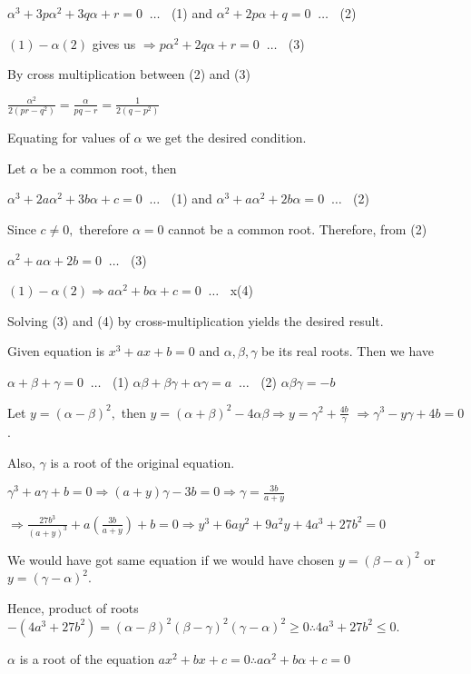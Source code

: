   $\alpha^3 + 3p\alpha^2 + 3q\alpha + r = 0\;\;\ldots\;\;$  (1) and $\alpha^2 + 2p\alpha + q = 0\;\;\ldots\;\;$ (2)

  $(1) - \alpha (2)$ gives us $\Rightarrow p\alpha^2 + 2q\alpha + r = 0\;\;\ldots\;\;$ (3)

  By cross multiplication between (2) and (3)

  $\frac{\alpha^2}{2(pr - q^2)} = \frac{\alpha}{pq - r} = \frac{1}{2(q - p^2)}$

  Equating for values of $\alpha$ we get the desired condition.
\item Let $\alpha$ be a common root, then

  $\alpha^3 + 2a\alpha^2 + 3b\alpha + c = 0\;\;\ldots\;\;$ (1) and $\alpha^3 + a\alpha^2 + 2b\alpha = 0\;\;\ldots\;\;$ (2)

  Since $c \ne 0,$ therefore $\alpha = 0$ cannot be a common root. Therefore, from (2)

  $\alpha^2 + a\alpha + 2b = 0\;\;\ldots\;\;$ (3)

  $(1) - \alpha (2) \Rightarrow a\alpha^2 + b\alpha + c = 0\;\;\ldots\;\;$ x(4)

  Solving (3) and (4) by cross-multiplication yields the desired result.
\item Given equation is $x^3 + ax + b = 0$ and $\alpha, \beta, \gamma$ be its real roots. Then we have

  $\alpha + \beta + \gamma = 0\;\;\ldots\;\;$ (1) $\alpha\beta + \beta\gamma + \alpha\gamma = a\;\;\ldots\;\;$ (2)
  $\alpha\beta\gamma = -b$

  Let $y = (\alpha - \beta)^2,$ then $y = (\alpha + \beta)^2 - 4\alpha\beta\Rightarrow y = \gamma^2 +
  \frac{4b}{\gamma}$ $\Rightarrow \gamma^3 - y\gamma + 4b = 0$.

  Also, $\gamma$ is a root of the original equation.

  $\gamma^3 + a\gamma + b = 0\Rightarrow (a + y)\gamma - 3b = 0 \Rightarrow \gamma = \frac{3b}{a + y}$

  $\Rightarrow \frac{27b^3}{(a + y)^3} + a\left(\frac{3b}{a + y}\right) + b = 0\Rightarrow y^3 + 6ay^2 +
  9a^2y + 4a^3 + 27b^2 = 0$

  We would have got same equation if we would have chosen $y = (\beta - \alpha)^2$ or $y = (\gamma - \alpha)^2$.

  Hence, product of roots $-(4a^3 + 27b^2) = (\alpha - \beta)^2(\beta - \gamma)^2(\gamma - \alpha)^2 \ge
  0\therefore 4a^3 + 27b^2 \le 0$.
\item $\alpha$ is a root of the equation $ax^2 + bx + c = 0\therefore a\alpha^2 + b\alpha + c = 0$


